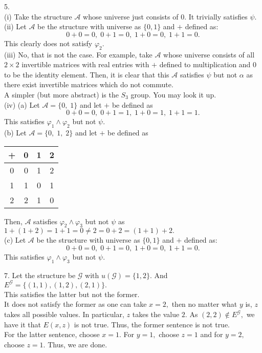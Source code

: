 \documentclass{article}
\begin{document}
5. \\
(i) Take the structure $\mathcal{A}$ whose universe just consists of $0.$ It trivially satisfies $\psi.$\\
(ii) Let $\mathcal{A}$ be the structure with universe as $\{0, 1\}$ and $+$ defined as:
\[0+0 = 0,\; 0+1 = 0, \; 1+0 = 0, \; 1+1=0.\]
This clearly does not satisfy $\varphi_2.$\\
(iii) No, that is not the case. For example, take $\mathcal{A}$ whose universe consists of all $2\times2$ invertible matrices with real entries with $+$ defined to multiplication and $0$ to be the identity element. Then, it is clear that this $\mathcal{A}$ satisfies $\psi$ but not $\alpha$ as there exist invertible matrices which do not commute.\\
A simpler (but more abstract) is the $S_3$ group. You may look it up.\\
(iv) (a) Let $\mathcal{A} = \{0,\;1\}$ and let $+$ be defined as
\[0+0 = 0,\; 0+1 = 1, \; 1+0 = 1, \; 1+1=1.\]
This satisfies $\varphi_1 \wedge \varphi_2$ but not $\psi.$\\
(b) Let $\mathcal{A} = \{0,\;1,\;2\}$ and let $+$ be defined as
\begin{center}
	\begin{tabular}{|c|c|c|c|}
	\hline
	+ & 0 & 1 & 2 \\
	\hline
	0 & 0 & 1 & 2 \\
	\hline
	1 & 1 & 0 & 1 \\
	\hline
	2 & 2 & 1 & 0 \\
	\hline  
	\end{tabular}
\end{center}
Then, $\mathcal{A}$ satisfies $\varphi_2 \wedge \varphi_3$ but not $\psi$ as $1 + (1 + 2) = 1 + 1 = 0 \neq 2 = 0 + 2 = (1 + 1) + 2.$\\
(c) Let $\mathcal{A}$ be the structure with universe as $\{0, 1\}$ and $+$ defined as:
\[0+0 = 0,\; 0+1 = 0, \; 1+0 = 0, \; 1+1=0.\]
This satisfies $\varphi_1 \wedge \varphi_3$ but not $\psi.$

\hrulefill

7. Let the structure be $\mathcal{G}$ with $u(\mathcal{G}) = \{1, 2\}.$ And $E^\mathcal{G} = \{(1, 1), (1, 2), (2, 1)\}.$\\
This satisfies the latter but not the former. \\
It does not satisfy the former as one can take $x = 2,$ then no matter what $y$ is, $z$ takes all possible values. In particular, $z$ takes the value $2.$ As $(2, 2) \notin E^\mathcal{G},$ we have it that $E(x, z)$ is not true. Thus, the former sentence is not true.\\
For the latter sentence, choose $x = 1.$ For $y = 1,$ choose $z = 1$ and for $y = 2,$ choose $z = 1.$ Thus, we are done.
\end{document}
